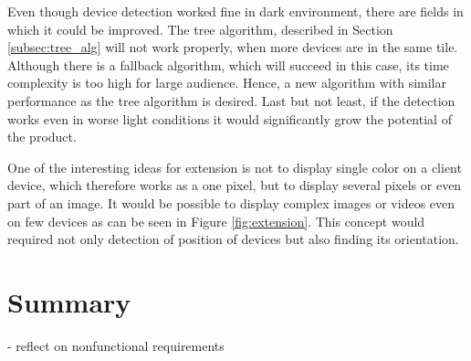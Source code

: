 Even though device detection worked fine in dark environment, there are fields in which it could be improved.
The tree algorithm, described in Section \ref{subsec:tree_alg} will not work properly, when more devices are in the same tile.
Although there is a fallback algorithm, which will succeed in this case, its time complexity is too high for large audience.
Hence, a new algorithm with similar performance as the tree algorithm is desired.
Last but not least, if the detection works even in worse light conditions it would significantly grow the potential of the product.

One of the interesting ideas for extension is not to display single color on a client device, which therefore works as a one pixel, but to display several pixels or even part of an image.
It would be possible to display complex images or videos even on few devices as can be seen in Figure \ref{fig:extension}.
This concept would required not only detection of position of devices but also finding its orientation.


\section{Summary}


- reflect on nonfunctional requirements